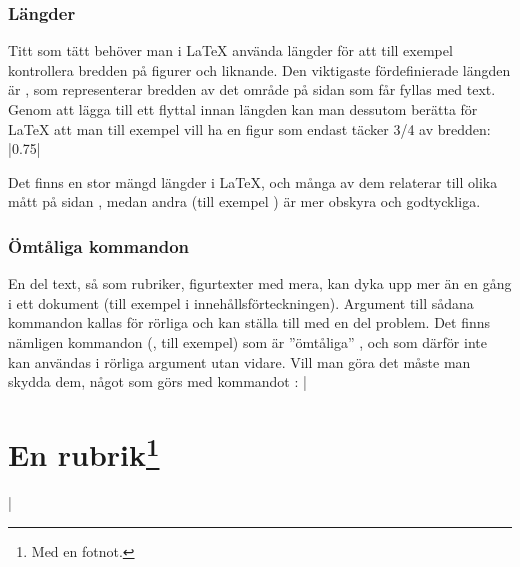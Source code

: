 \documentclass[../../latex.tex]{subfiles}
\begin{document}
\subsubsection{Längder}
Titt som tätt behöver man i \LaTeX{} använda längder för att till exempel
kontrollera bredden på figurer och liknande. Den viktigaste fördefinierade
längden är , som representerar bredden av det område på
sidan som får fyllas med text. Genom att lägga till ett flyttal innan
längden kan man dessutom berätta för \LaTeX{} att man till exempel vill
ha en figur som endast täcker \num{3/4} av bredden:
\latex|0.75\textwidth|

Det finns en stor mängd längder i \LaTeX, och många av dem relaterar till
olika mått på sidan \cite[s.~132]{Oetiker11}, medan andra (till exempel
) är mer obskyra och godtyckliga.

\subsubsection{Ömtåliga kommandon}
En del text, så som rubriker, figurtexter med mera, kan dyka upp mer än en
gång i ett dokument (till exempel i innehållsförteckningen). Argument till
sådana kommandon kallas för rörliga  och kan ställa
till med en del problem. Det finns nämligen kommandon (,
till exempel) som är ”ömtåliga” , och som därför inte kan
användas i rörliga argument utan vidare. Vill man göra det måste man
skydda dem, något som görs med kommandot :
\latex|\section{En rubrik\protect\footnote{Med en fotnot.}}|
\end{document}
